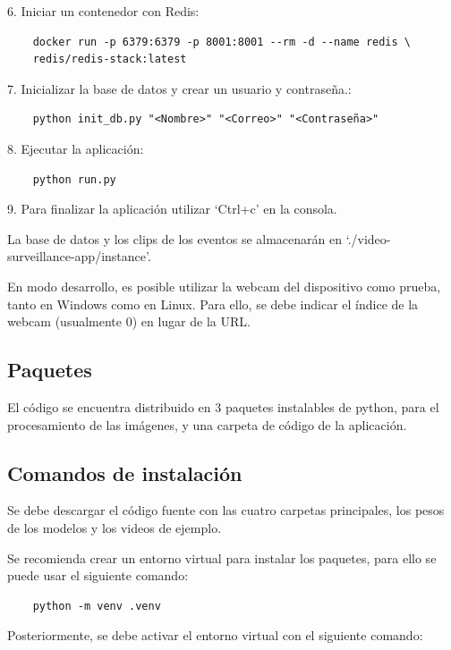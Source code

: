 \documentclass[11pt,a4paper]{article}
\begin{document}
6. Iniciar un contenedor con Redis:

\begin{verbatim}
    docker run -p 6379:6379 -p 8001:8001 --rm -d --name redis \
    redis/redis-stack:latest
\end{verbatim}

7. Inicializar la base de datos y crear un usuario y contraseña.:

\begin{verbatim}
    python init_db.py "<Nombre>" "<Correo>" "<Contraseña>"
\end{verbatim}

8. Ejecutar la aplicación:

\begin{verbatim}
    python run.py
\end{verbatim}

9. Para finalizar la aplicación utilizar `Ctrl+c' en la consola.

La base de datos y los clips de los eventos se almacenarán en `./video-surveillance-app/instance'.

En modo desarrollo, es posible utilizar la webcam del dispositivo como prueba, tanto en Windows como en Linux. Para ello, se debe indicar el índice de la webcam (usualmente 0) en lugar de la URL.

\subsection{Paquetes}

El código se encuentra distribuido en 3 paquetes instalables de python, para el procesamiento de las imágenes, y una carpeta de código de la aplicación.

\subsection{Comandos de instalación}

Se debe descargar el código fuente con las cuatro carpetas principales, los pesos de los modelos y los videos de ejemplo.

Se recomienda crear un entorno virtual para instalar los paquetes, para ello se puede usar el siguiente comando:

\begin{verbatim}
    python -m venv .venv
\end{verbatim}

Posteriormente, se debe activar el entorno virtual con el siguiente comando:
\end{document}
